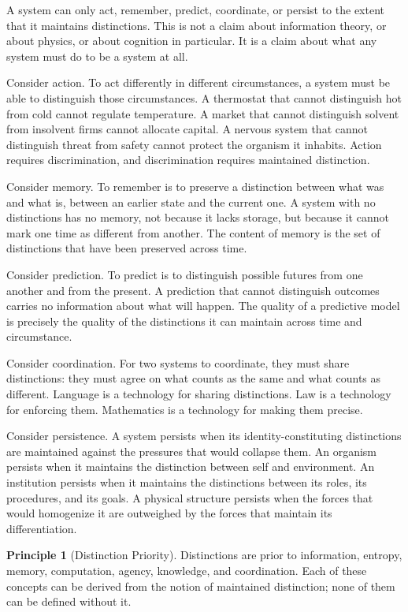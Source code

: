 \documentclass[12pt,a4paper]{book}
\theoremstyle{remark}
\theoremstyle{definition}
\newtheorem{principle}{Principle}[chapter]
\begin{document}
A system can only act, remember, predict, coordinate, or persist to the
extent that it maintains distinctions. This is not a claim about
information theory, or about physics, or about cognition in particular.
It is a claim about what any system must do to be a system at all.

Consider action. To act differently in different circumstances, a system
must be able to distinguish those circumstances. A thermostat that cannot
distinguish hot from cold cannot regulate temperature. A market that cannot
distinguish solvent from insolvent firms cannot allocate capital. A nervous
system that cannot distinguish threat from safety cannot protect the
organism it inhabits. Action requires discrimination, and discrimination
requires maintained distinction.

Consider memory. To remember is to preserve a distinction between what was
and what is, between an earlier state and the current one. A system with
no distinctions has no memory, not because it lacks storage, but because
it cannot mark one time as different from another. The content of memory
is the set of distinctions that have been preserved across time.

Consider prediction. To predict is to distinguish possible futures from one
another and from the present. A prediction that cannot distinguish outcomes
carries no information about what will happen. The quality of a predictive
model is precisely the quality of the distinctions it can maintain across
time and circumstance.

Consider coordination. For two systems to coordinate, they must share
distinctions: they must agree on what counts as the same and what counts
as different. Language is a technology for sharing distinctions. Law is
a technology for enforcing them. Mathematics is a technology for making
them precise.

Consider persistence. A system persists when its identity-constituting
distinctions are maintained against the pressures that would collapse them.
An organism persists when it maintains the distinction between self and
environment. An institution persists when it maintains the distinctions
between its roles, its procedures, and its goals. A physical structure
persists when the forces that would homogenize it are outweighed by the
forces that maintain its differentiation.

\begin{principle}[Distinction Priority]
Distinctions are prior to information, entropy, memory, computation,
agency, knowledge, and coordination. Each of these concepts can be
derived from the notion of maintained distinction; none of them can be
defined without it.
\end{principle}
\end{document}
